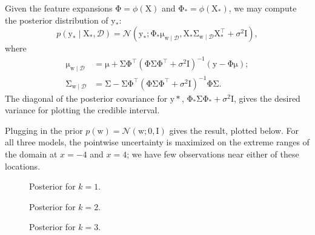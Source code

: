 \documentclass{article}
\newcommand{\given}{\mid}
\newcommand{\mc}[1]{\mathcal{#1}}
\newcommand{\data}{\mc{D}}
\newcommand{\mat}[1]{\bm{\mathrm{#1}}}
\renewcommand{\vec}[1]{\bm{\mathrm{#1}}}
\newcommand{\trans}{^\top}
\newcommand{\inv}{^{-1}}
\begin{document}
Given the feature expansions $\mat{\Phi} = \phi(\mat{X})$ and
$\mat{\Phi}_\ast = \phi(\mat{X}_\ast)$, we may compute the posterior
distribution of $\vec{y}_\ast$:
\begin{equation*}
  p(\vec{y}_\ast \given \vec{X}_\ast, \data)
  =
  \mc{N}(\vec{y}_\ast;
  \mat{\Phi}_\ast \vec{\mu}_{\vec{w}\given\data},
  \mat{X}_\ast \mat{\Sigma}_{\vec{w}\given\data} \mat{X}_\ast\trans + \sigma^2 \mat{I}),
\end{equation*}
where
\begin{align*}
  \vec{\mu}_{\vec{w}\given\data}
  &=
  \vec{\mu}
  +
  \mat{\Sigma}
  \mat{\Phi}\trans
  (\mat{\Phi}\mat{\Sigma}\mat{\Phi}\trans + \sigma^2 \mat{I})\inv
  (\vec{y} - \mat{\Phi}\vec{\mu});
  \\
  \mat{\Sigma}_{\vec{w}\given\data}
  &=
  \mat{\Sigma}
  -
  \mat{\Sigma}
  \mat{\Phi}\trans
  (\mat{\Phi}\mat{\Sigma}\mat{\Phi}\trans + \sigma^2 \mat{I})\inv
  \mat{\Phi}
  \mat{\Sigma}.
\end{align*}
The diagonal of the posterior covariance for $\vec{y}\ast$,
$\mat{\Phi}_\ast\mat{\Sigma}\mat{\Phi}_\ast + \sigma^2\mat{I}$,
gives the desired variance for plotting the credible interval.

Plugging in the prior $p(\vec{w}) = \mc{N}(\vec{w}; \vec{0}, \mat{I})$
gives the result, plotted below.  For all three models, the pointwise
uncertainty is maximized on the extreme ranges of the domain at $x =
-4$ and $x = 4$; we have few observations near either of these
locations.

\begin{figure}
  \centering
  
  \caption{Posterior for $k = 1$.}
  \label{order_1_expansion}
\end{figure}

\begin{figure}
  \centering
  
  \caption{Posterior for $k = 2$.}
  \label{order_2_expansion}
\end{figure}

\begin{figure}
  \centering
  
  \caption{Posterior for $k = 3$.}
  \label{order_3_expansion}
\end{figure}
\end{document}
